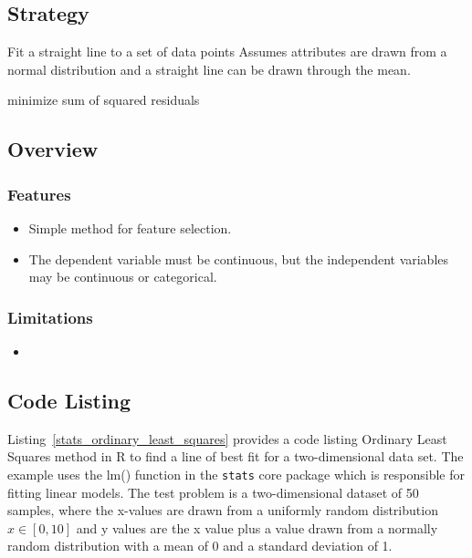 \subsection{Strategy}

Fit a straight line to a set of data points
Assumes attributes are drawn from a normal distribution and a straight line can be drawn through the mean.

minimize sum of squared residuals


\subsection{Overview}

\subsubsection{Features}

\begin{itemize}
	\item Simple method for feature selection.
	\item The dependent variable must be continuous, but the independent variables may be continuous or categorical.
\end{itemize}

\subsubsection{Limitations}

\begin{itemize}
	\item 
\end{itemize}

\subsection{Code Listing}
Listing~\ref{stats_ordinary_least_squares} provides a code listing Ordinary Least Squares method in R to find a line of best fit for a two-dimensional data set.
The example uses the {lm()} function in the \texttt{stats} core package which is responsible for fitting linear models.
The test problem is a two-dimensional dataset of 50 samples, where the x-values are drawn from a uniformly random distribution $x \in [0,10]$ and y values are the x value plus a value drawn from a normally random distribution with a mean of 0 and a standard deviation of 1.

